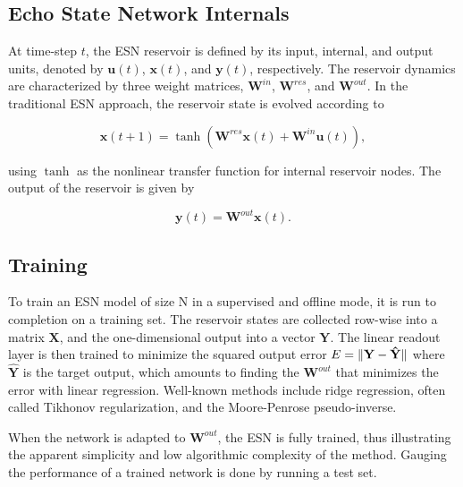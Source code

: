 \subsection{Echo State Network Internals}


At time-step $t$, the ESN reservoir is defined by its input, internal, and
output units, denoted by $\mathbf{u}(t)$, $\mathbf{x}(t)$, and $\mathbf{y}(t)$,
respectively. The reservoir dynamics are characterized by three weight matrices,
$\mathbf{W}^{in}$, $\mathbf{W}^{res}$, and $\mathbf{W}^{out}$. In the
traditional ESN approach, the reservoir state is evolved according to

\begin{equation}
  \mathbf{x}(t + 1) =
    \tanh(\mathbf{W}^{res}\mathbf{x}(t)
        + \mathbf{W}^{in}\mathbf{u}(t)),
  \label{xt}
\end{equation}

\noindent using $\tanh$ as the nonlinear transfer function for internal
reservoir nodes. The output of the reservoir is given by

\begin{equation}
  \mathbf{y}(t) =
    \mathbf{W}^{out}\mathbf{x}(t).
  \label{yt}
\end{equation}

\subsection{Training}

To train an ESN model of size N in a supervised and offline mode, it is run to
completion on a training set. The reservoir states are collected row-wise into a
matrix $\mathbf{X}$, and the one-dimensional output into a vector
$\mathbf{Y}$. The linear readout layer is then trained to minimize the squared
output error $E = \Vert \mathbf{Y} - \mathbf{\hat{Y}} \Vert$ where $\mathbf{\hat{Y}}$
is the target output, which amounts to finding the $\mathbf{W}^{out}$ that
minimizes the error with linear regression. Well-known methods include ridge
regression, often called Tikhonov regularization, and the Moore-Penrose
pseudo-inverse.

When the network is adapted to $\mathbf{W}^{out}$, the ESN is fully trained,
thus illustrating the apparent simplicity and low algorithmic complexity of the
method. Gauging the performance of a trained network is done by running a test
set.

